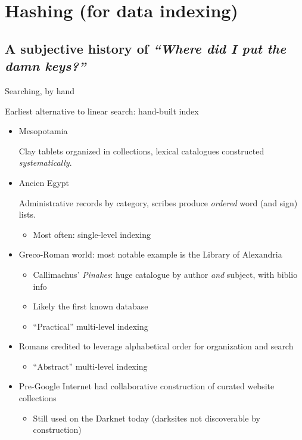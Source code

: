 \section{Hashing (for data indexing)}

\subsection{A subjective history of {\em ``Where did I put the damn keys?''}}

\begin{frame}[fragile]{Searching, by hand}

  Earliest alternative to linear search: hand-built index
  \begin{itemize}
  \item Mesopotamia

    Clay tablets organized in collections, lexical catalogues constructed {\em systematically}.

  \item Ancien Egypt

    Administrative records by category, scribes produce {\em ordered} word (and sign) lists.

    \begin{itemize}
    \item Most often: single-level indexing
    \end{itemize}

  \item Greco-Roman world: most notable example is the Library of Alexandria
    \begin{itemize}
    \item Callimachus' {\em Pinakes}: huge catalogue by author {\em and} subject, with biblio info
    \item Likely the first known database
    \item ``Practical'' multi-level indexing
    \end{itemize}
  \item Romans credited to leverage alphabetical order for organization and search
    \begin{itemize}
    \item ``Abstract'' multi-level indexing
    \end{itemize}
  \item Pre-Google Internet had collaborative construction of curated website collections
    \begin{itemize}
    \item Still used on the Darknet today (darksites not discoverable by construction)
    \end{itemize}
  \end{itemize}

\end{frame}


